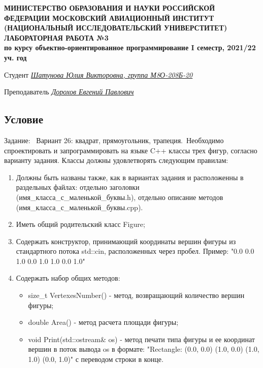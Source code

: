 \documentclass[12pt]{article}
\begin{document}
\begin{titlepage}
\begin{center}
\textbf{МИНИСТЕРСТВО ОБРАЗОВАНИЯ И НАУКИ РОССИЙСКОЙ ФЕДЕРАЦИИ
\medskip
МОСКОВСКИЙ АВИАЦИОННЫЙ ИНСТИТУТ
(НАЦИОНАЛЬНЫЙ ИССЛЕДОВАТЕЛЬСКИЙ УНИВЕРСТИТЕТ)
\vfill\vfill
{\Huge ЛАБОРАТОРНАЯ РАБОТА №3} \\
по курсу объектно-ориентированное программирование
I семестр, 2021/22 уч. год}
\end{center}
\vfill

Студент \uline{\it {Шатунова Юлия Викторовна, группа М8О-208Б-20}\hfill}

Преподаватель \uline{\it {Дорохов Евгений Павлович}\hfill}

\vfill
\end{titlepage}

\subsection*{Условие}

Задание: \
Вариант 26: квадрат, прямоугольник, трапеция.\
Необходимо спроектировать и запрограммировать на языке C++ классы трех фигур, согласно варианту задания. Классы должны удовлетворять следующим правилам:
\begin{enumerate}
\item Должны быть названы также, как в вариантах задания и расположенны в раздельных файлах: отдельно заголовки (имя\_класса\_с\_маленькой\_буквы.h), отдельно описание методов (имя\_класса\_с\_маленькой\_буквы.cpp).
\item Иметь общий родительский класс Figure;
\item Содержать конструктор, принимающий координаты вершин фигуры из стандартного потока std::cin, расположенных через пробел. Пример: "0.0 0.0 1.0 0.0 1.0 1.0 0.0 1.0"
\item Содержать набор общих методов:
\begin{itemize}
    \item size\_t VertexesNumber() - метод, возвращающий количество вершин фигуры;
    \item double Area() - метод расчета площади фигуры;
    \item void Print(std::ostream& os) - метод печати типа фигуры и ее координат вершин в поток вывода os в формате: "Rectangle: (0.0, 0.0) (1.0, 0.0) (1.0, 1.0) (0.0, 1.0)" с переводом строки в конце.
\end{itemize}
\end{enumerate}
\end{document}
